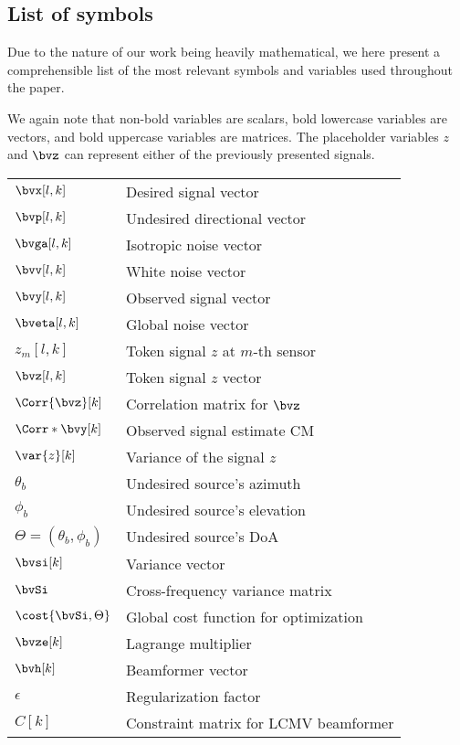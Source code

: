 \subsection{List of symbols}
\label{app:appA:list_of_symbols}
Due to the nature of our work being heavily mathematical, we here present a comprehensible list of the most relevant symbols and variables used throughout the paper.

We again note that non-bold variables are scalars, bold lowercase variables are vectors, and bold uppercase variables are matrices. The placeholder variables $z$ and $\bvz$ can represent either of the previously presented signals.

\begin{tabular}{l l}
	$\bvx[l,k]$ & Desired signal vector \\
	$\bvp[l,k]$ & Undesired directional vector \\
	$\bvga[l,k]$ & Isotropic noise vector \\
	$\bvv[l,k]$ & White noise vector \\
	$\bvy[l,k]$ & Observed signal vector \\
	$\bveta[l,k]$ & Global noise vector \\
	$z_m[l,k]$ & Token signal $z$ at $m$-th sensor\\
	$\bvz[l,k]$ & Token signal $z$ vector \\
	$\Corr{\bvz}[k]$ & Correlation matrix for $\bvz$\\
	$\Corr*{\bvy}[k]$ & Observed signal estimate CM\\
	$\var{z}[k]$ & Variance of the signal $z$ \\
	$\theta_b$ & Undesired source's azimuth \\
	$\phi_b$ & Undesired source's elevation \\
	$\Theta = (\theta_b,\phi_b)$ & Undesired source's DoA \\
	$\bvsi[k]$ & Variance vector \\
	$\bvSi$ & Cross-frequency variance matrix \\
	$\cost{\bvSi,\Theta}$ & Global cost function for optimization \\
	$\bvze[k]$ & Lagrange multiplier	\\
	$\bvh[k]$ & Beamformer vector \\
	$\epsilon$ & Regularization factor \\
	$C[k]$ & Constraint matrix for LCMV beamformer
\end{tabular}